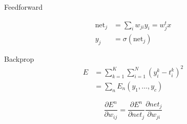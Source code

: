 \documentclass[10pt, compress, xetex]{beamer}
\begin{document}
\begin{frame}{Feedforward}
\begin{figure}[ht!]
  \centering
\end{figure}

\begin{align}
	\text{net}_j & = \sum_{i} w_{ji} y_i = w_j^t x \\
	y_j & = \sigma (\text{net}_j)
\end{align} 
\end{frame}

\begin{frame}{Backprop}
\begin{align}
	E &= \sum_{k=1}^K \sum_{i=1}^N \left( y_i^k - t_i^k \right)^2 \\
	  &=  \sum_n E_n(y_1, \ldots, y_c)
\end{align}

\begin{equation}
\frac{\partial E^n}{\partial w_{ij}} = \frac{\partial E^n}{\partial net_j}  \frac{\partial net_j }{\partial w_{ji}}
\end{equation}

\end{frame}
\end{document}
